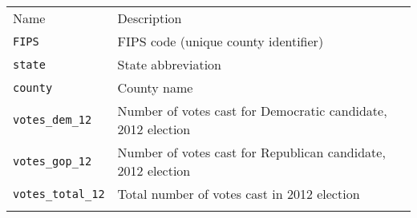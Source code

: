 \documentclass[]{article}
\begin{document}
\begin{longtable}[c]{@{}ll@{}}
\toprule\addlinespace
\begin{minipage}[b]{0.20\columnwidth}\raggedright
Name
\end{minipage} & \begin{minipage}[b]{0.74\columnwidth}\raggedright
Description
\end{minipage}
\\\addlinespace
\midrule\endhead
\begin{minipage}[t]{0.20\columnwidth}\raggedright
\texttt{FIPS}
\end{minipage} & \begin{minipage}[t]{0.74\columnwidth}\raggedright
FIPS code (unique county identifier)
\end{minipage}
\\\addlinespace
\begin{minipage}[t]{0.20\columnwidth}\raggedright
\texttt{state}
\end{minipage} & \begin{minipage}[t]{0.74\columnwidth}\raggedright
State abbreviation
\end{minipage}
\\\addlinespace
\begin{minipage}[t]{0.20\columnwidth}\raggedright
\texttt{county}
\end{minipage} & \begin{minipage}[t]{0.74\columnwidth}\raggedright
County name
\end{minipage}
\\\addlinespace
\begin{minipage}[t]{0.20\columnwidth}\raggedright
\texttt{votes\_dem\_12}
\end{minipage} & \begin{minipage}[t]{0.74\columnwidth}\raggedright
Number of votes cast for Democratic candidate, 2012 election
\end{minipage}
\\\addlinespace
\begin{minipage}[t]{0.20\columnwidth}\raggedright
\texttt{votes\_gop\_12}
\end{minipage} & \begin{minipage}[t]{0.74\columnwidth}\raggedright
Number of votes cast for Republican candidate, 2012 election
\end{minipage}
\\\addlinespace
\begin{minipage}[t]{0.20\columnwidth}\raggedright
\texttt{votes\_total\_12}
\end{minipage} & \begin{minipage}[t]{0.74\columnwidth}\raggedright
Total number of votes cast in 2012 election
\end{minipage}
\\\addlinespace
\bottomrule
\end{longtable}
\end{document}
